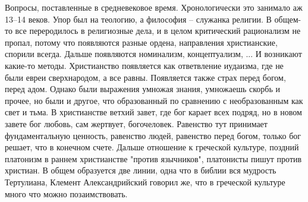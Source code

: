 \documentclass[a4paper, 12pt]{article}
\begin{document}
Вопросы, поставленные в средневековое время. Хронологически это занимало 
аж 13--14 веков. Упор был на теологию, а философия -- служанка религии. 
В общем-то все переродилось в религиозные дела, и в целом критический 
рационализм не пропал, потому что появляются разные ордена, направления 
христианские, спорили всегда. Дальше появляются номинализм, 
концептуализм, ... И возникают какие-то методы. Христианство появляется 
как ответвление иудаизма, где не были евреи сверхнародом, а все равны. 
Появляется также страх перед богом, перед адом. Однако были выражения 
умножая знания, умножаешь скорбь и прочее, но были и другое, что 
образованный по сравнению с необразованным как свет и тьма. 
В христианстве ветхий завет, где бог карает всех подряд, но в новом 
завете бог любовь, сам жертвует, богочеловек. Равенство тут принимает 
фундаментальную ценность, равенство людей, равенство перед богом, только 
бог решает, что в конечном счете. Дальше отношение к греческой культуре, 
поздний платонизм в раннем христианстве "против язычников", платонисты 
пишут против христиан. В общем образуется две линии, одна что в библии 
вся мудрость Тертулиана, Клемент Александрийский говорил же, что 
в греческой культуре много что можно позаимствовать.
\end{document}
